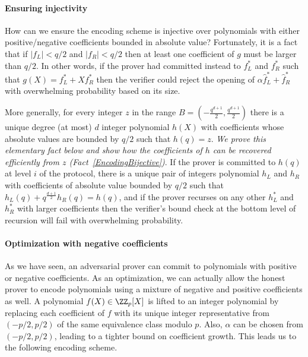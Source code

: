\paragraph{Ensuring injectivity} How can we ensure the encoding scheme is injective over polynomials with either positive/negative coefficients bounded in absolute value? Fortunately, it is a fact that if $|f_L| < q/2$ and $|f_R| < q/2$ then at least one coefficient of $g$ must be larger than $q/2$. In other words, if the prover had committed instead to $f^*_L$ and $f^*_R$ such that $g(X) = f^*_L + Xf^*_R$ then the verifier could reject the opening of $\alpha \hat{f}^*_L + \hat{f}^*_R$ with overwhelming probability based on its size. 


More generally, for every integer $z$ in the range $B = (-\frac{q^{d+1}}{2}, \frac{q^{d+1}}{2})$ there is a unique degree (at most) $d$ integer polynomial $h(X)$ with coefficients whose absolute values are bounded by $q/2$ such that $h(q) = z$. \emph{We prove this elementary fact below and show how the coefficients of $h$ can be recovered efficiently from $z$ (Fact~\ref{EncodingBijective})}. If the prover is committed to $h(q)$ at level $i$ of the protocol, there is a unique pair of integers polynomial $h_L$ and $h_R$ with coefficients of absolute value bounded by $q/2$ such that $h_L(q) + q^{\frac{d+1}{2}} h_R(q) = h(q)$, and if the prover recurses on any other $h_L^*$ and $h_R^*$ with larger coefficients then the verifier's bound check at the bottom level of recursion will fail with overwhelming probability. 

\paragraph{Optimization with negative coefficients} As we have seen, an adversarial prover can commit to polynomials with positive or negative coefficients. As an optimization, we can actually allow the honest prover to encode polynomials using a mixture of negative and positive coefficients as well. A polynomial $f(X) \in \ZZ_p[X]$ is lifted to an integer polynomial by replacing each coefficient of $f$ with its unique integer representative from $(-p/2,p/2)$ of the same equivalence class modulo $p$. Also, $\alpha$ can be chosen from $(-p/2, p/2)$, leading to a tighter bound on coefficient growth. This leads us to the following encoding scheme. 

